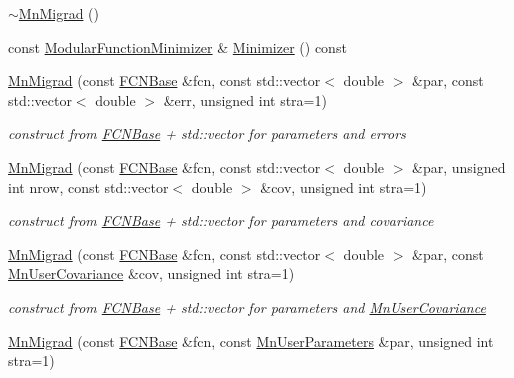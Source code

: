 \begin{DoxyCompactItemize}
\item 
\mbox{\hyperlink{classROOT_1_1Minuit2_1_1MnMigrad_a7a415c2b0378cf8f4606e53b7d20ae63}{$\sim$\+Mn\+Migrad}} ()
\item 
const \mbox{\hyperlink{classROOT_1_1Minuit2_1_1ModularFunctionMinimizer}{Modular\+Function\+Minimizer}} \& \mbox{\hyperlink{classROOT_1_1Minuit2_1_1MnMigrad_a98fa0ce74bf180a287093ac677e8644c}{Minimizer}} () const
\item 
\mbox{\hyperlink{classROOT_1_1Minuit2_1_1MnMigrad_a3a3610c55a91cb68fb3b95506ff08339}{Mn\+Migrad}} (const \mbox{\hyperlink{classROOT_1_1Minuit2_1_1FCNBase}{F\+C\+N\+Base}} \&fcn, const std\+::vector$<$ double $>$ \&par, const std\+::vector$<$ double $>$ \&err, unsigned int stra=1)
\begin{DoxyCompactList}\small\item\em construct from \mbox{\hyperlink{classROOT_1_1Minuit2_1_1FCNBase}{F\+C\+N\+Base}} + std\+::vector for parameters and errors \end{DoxyCompactList}\item 
\mbox{\hyperlink{classROOT_1_1Minuit2_1_1MnMigrad_a72c6740b17d24c92d0a0049d52de778e}{Mn\+Migrad}} (const \mbox{\hyperlink{classROOT_1_1Minuit2_1_1FCNBase}{F\+C\+N\+Base}} \&fcn, const std\+::vector$<$ double $>$ \&par, unsigned int nrow, const std\+::vector$<$ double $>$ \&cov, unsigned int stra=1)
\begin{DoxyCompactList}\small\item\em construct from \mbox{\hyperlink{classROOT_1_1Minuit2_1_1FCNBase}{F\+C\+N\+Base}} + std\+::vector for parameters and covariance \end{DoxyCompactList}\item 
\mbox{\hyperlink{classROOT_1_1Minuit2_1_1MnMigrad_a7830eb76c9d314bc8e101ac34150ccb8}{Mn\+Migrad}} (const \mbox{\hyperlink{classROOT_1_1Minuit2_1_1FCNBase}{F\+C\+N\+Base}} \&fcn, const std\+::vector$<$ double $>$ \&par, const \mbox{\hyperlink{classROOT_1_1Minuit2_1_1MnUserCovariance}{Mn\+User\+Covariance}} \&cov, unsigned int stra=1)
\begin{DoxyCompactList}\small\item\em construct from \mbox{\hyperlink{classROOT_1_1Minuit2_1_1FCNBase}{F\+C\+N\+Base}} + std\+::vector for parameters and \mbox{\hyperlink{classROOT_1_1Minuit2_1_1MnUserCovariance}{Mn\+User\+Covariance}} \end{DoxyCompactList}\item 
\mbox{\hyperlink{classROOT_1_1Minuit2_1_1MnMigrad_a552ce72a98922a75ef921a3cccfe97c1}{Mn\+Migrad}} (const \mbox{\hyperlink{classROOT_1_1Minuit2_1_1FCNBase}{F\+C\+N\+Base}} \&fcn, const \mbox{\hyperlink{classROOT_1_1Minuit2_1_1MnUserParameters}{Mn\+User\+Parameters}} \&par, unsigned int stra=1)

\end{DoxyCompactItemize}
